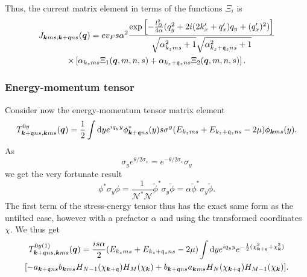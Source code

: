 Thus, the current matrix element in terms of  the functions \( \Xi_i \) is
\begin{multline}
  J_{\bm{k} m s; \bm{k} + \mathfrak{q} n s} (\bm{q}) =
  e v_F s \alpha^2
  \frac{
    \exp \left[
      -\frac{l_{B}^2}{4 \alpha } (q_{y}^2 + 2i (2 k' _x + q' _x) q_{y} + (q'_x)^2 )
    \right]
  }{
    \sqrt{\alpha_{k_z m s}^2 + 1} \sqrt{\alpha_{k_z + \mathfrak{q}_z n s}^2 + 1}
  }\\
 \times \left[
     \alpha_{k_z m s} \Xi_1(\bm{q}, m, n, s) + \alpha_{k_z + \mathfrak{q}_z n s} \Xi_2(\bm{q}, m, n, s)
  \right].
\end{multline}

\subsubsection{Energy-momentum tensor}
Consider now the energy-momentum tensor matrix element
\begin{equation}
  \label{eq:106}
  T_{\bm{k} + \mathfrak{q} n s, \bm{k} m s}^{0y} (\bm{q}) =
  \frac{1}{2}
  \int \mathrm{d} y
  e^{i q_{y} y}
  \phi ^{*}_{\bm{k} + \mathfrak{q} n s}(y) s \sigma ^{y}
  (E_{k_z m  s} + E_{k_z+\mathfrak{q}_z n s} - 2 \mu)
  \phi _{\bm{k} m s} (y).
\end{equation}
As
\begin{equation}
  \label{eq:107}
  \sigma _{y} e^{\theta /2 \sigma _{x}} = e^{-\theta /2 \sigma _{x}} \sigma _{y}
\end{equation}
we get the very fortunate result
\begin{equation}
  \label{eq:108}
  \phi^{*} \sigma _{y} \phi
  = \frac{1}{\mathcal{N}^{*} \mathcal{N}} \tilde{\phi}^{*} \sigma _{y} \tilde{\phi}
  = \alpha \tilde{\phi}^{*} \sigma _{y} \tilde{\phi}.
\end{equation}
The first term of the stress-energy tensor thus has the exact same form as the untilted case, however with a prefactor \( \alpha \) and using the transformed coordinates \( \chi \).
We thus get
\begin{multline}
  \label{eq:109}
  T_{\vec{k}+\qvec{q} ns, \vec{k} m s}^{0y (1)} (\vec{q}) =
  \frac{is \alpha}{2} (E_{k_z m s} + E_{k_z + \qvec{q}_z n s} - 2 \mu)
  \int \mathrm{d} y
  e^{i q_{y} y}
  e^{-\frac{1}{2} (\chi_{\vec{k}+\qvec{q}}^2 + \chi_{\vec{k}} ^2) }\\
  [
  -a_{\vec{k} + \qvec{q} ns} b_{\vec{k} m s} H_{N-1} (\chi_{\vec{k} + \qvec{q}}) H_{M} (\chi_{\vec{k}})
  + b_{\vec{k} + \qvec{q} n s} a_{\vec{k} ms} H_{N}(\chi_{\vec{k} + \qvec{q}}) H_{M-1} (\chi_{\vec{k}})
  ].
\end{multline}

